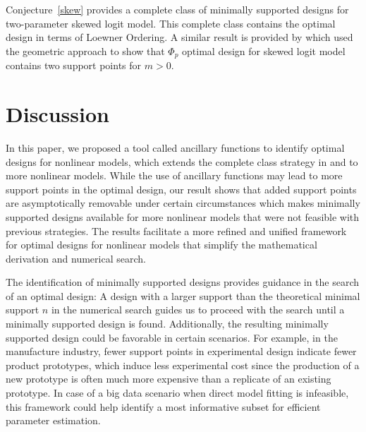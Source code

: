 \documentclass[12pt]{amsart}
\theoremstyle{definition}
\theoremstyle{remark}
\numberwithin{equation}{section}
\begin{document}
Conjecture~\ref{skew} provides a complete class of minimally supported designs for two-parameter skewed logit model. This complete class contains the optimal design in terms of Loewner Ordering. A similar result is provided by \cite{biedermann2006} which used the geometric approach to show that $\Phi_p$ optimal design for skewed logit model contains two support points for $m>0$. 



\section{Discussion}\label{dis}
In this paper, we proposed a tool called ancillary functions to identify optimal designs for nonlinear models, which extends the complete class strategy in \cite{yang2010} and \cite{yang2012} to more nonlinear models. While the use of ancillary functions may lead to more support points in the optimal design, our result shows that added support points are asymptotically removable under certain circumstances which makes minimally supported designs available for more nonlinear models that were not feasible with previous strategies. The results facilitate a more refined and unified framework for optimal designs for nonlinear models that simplify the mathematical derivation and numerical search.



The identification of minimally supported designs provides guidance in the search of an optimal design: A design with a larger support than the theoretical minimal support $n$ in the numerical search guides us to proceed with the search until a minimally supported design is found. Additionally, the resulting minimally supported design could be favorable in certain scenarios.
For example, in the manufacture industry, fewer support points in experimental design indicate fewer product prototypes, which induce less experimental cost since the production of a new prototype is often much more expensive than a replicate of an existing prototype.  In case of a big data scenario when direct model fitting is infeasible, this framework could help identify a most informative subset for efficient parameter estimation.

 
\end{document}
